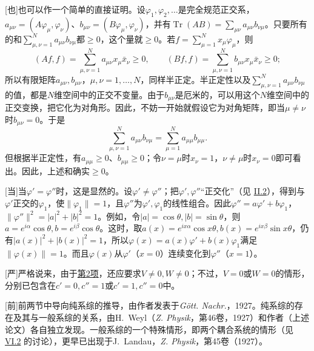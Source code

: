 \documentclass[fontsize=13pt,twoside,openany,headings=normal,parskip=false,bookmarkpackage=false,DIV=calc]{scrbook}
\begin{document}
[也]{也可以作一个简单的直接证明。设$\varphi_1,\allowbreak \varphi_2,\allowbreak \ldots$是完全规范正交系，$a_{\mu\nu}=(A\varphi_\mu,\allowbreak \varphi_\nu)$、$b_{\mu\nu}=(B\varphi_\mu,\allowbreak \varphi_\nu)$，并有$\operatorname{Tr}(AB)=\sum_{\mu\nu}a_{\mu\nu}b_{\nu\mu}$。只要所有的和$\sum_{\mu,\allowbreak \nu=1}^Na_{\mu\nu}b_{\nu\mu}$都$\ge0$，这个量就$\ge0$。若$f=\sum_{\mu=1}^Nx_\mu\varphi_\mu$，则
\[
(Af,f)=\sum_{\mu,\nu=1}^Na_{\mu\nu}x_\mu\bar x_\nu\ge0,\qquad
(Bf,f)=\sum_{\mu,\nu=1}^Nb_{\mu\nu}x_\mu\bar x_\nu\ge0;
\]
所以有限矩阵$a_{\mu\nu},\allowbreak b_{\mu\nu}$，$\mu,\allowbreak \nu=1,\allowbreak \ldots,\allowbreak N$，同样半正定。半正定性以及$\sum_{\mu,\allowbreak \nu=1}^Na_{\mu\nu}b_{\nu\mu}$的值，都是$N$维空间中的正交不变量。由于$b_{\mu\nu}$是厄米的，可以用这个$N$维空间中的正交变换，把它化为对角形。因此，不妨一开始就假设它为对角矩阵，即当$\mu\ne\nu$时$b_{\mu\nu}=0$。于是
\[
\sum_{\mu,\nu=1}^Na_{\mu\nu}b_{\nu\mu}=\sum_{\mu=1}^Na_{\mu\mu}b_{\mu\mu}.
\]
但根据半正定性，有$a_{\mu\mu}\ge0$、$b_{\mu\mu}\ge0$；令$\nu=\mu$时$x_\nu=1$，$\nu\ne\mu$时$x_\nu=0$即可看出。因此，上述和确实$\ge0$。}

[当]{\hypertarget{origpage-258}{}\label{origpage-258}当$\varphi'=\varphi''$时，这是显然的。设$\varphi'\ne\varphi''$；把$\varphi',\allowbreak \varphi''$“正交化”（见 \hyperref[sec:II.2]{II.2}），得到与$\varphi'$正交的$\varphi_1$，使$\|\varphi_1\|=1$，且$\varphi''$为$\varphi',\allowbreak \varphi_1$的线性组合。因此$\varphi''=a\varphi'+b\varphi_1$，$\|\varphi''\|^2=|a|^2+|b|^2=1$。例如，令$|a|=\cos\theta,\allowbreak |b|=\sin\theta$，则$a=e^{i\alpha}\cos\theta,\allowbreak b=e^{i\beta}\cos\theta$。这时，取$a(x)=e^{ix\alpha}\cos x\theta,\allowbreak b(x)=e^{ix\beta}\sin x\theta$，仍有$|a(x)|^2+|b(x)|^2=1$，所以$\varphi(x)=a(x)\varphi'+b(x)\varphi_1$满足$\|\varphi(x)\|=1$。而且$\varphi(x)$从$\varphi'$（$x=0$）连续变化到$\varphi''$（$x=1$）。}

[严]{严格说来，由于\CJKglue \hyperref[remark:IV.2.2]{第2项}，还应要求$V\ne0,\allowbreak W\ne0$；不过，$V=0$或$W=0$的情形，分别已包含在$c'=0,\allowbreak c''=1$或$c'=1,\allowbreak c''=0$中。}

[前]{前两节中导向纯系综的推导，由作者发表于\emph{Gött. Nachr.}，1927。纯系综的存在及其与一般系综的关系，由H.~Weyl（\emph{Z. Physik}，第46卷，1927）和作者（上述论文）各自独立发现。一般系综的一个特殊情形，即两个耦合系统的情形（见 \hyperref[sec:VI.2]{VI.2} 的讨论），更早已出现于J.~Landau，\emph{Z. Physik}，第45卷（1927）。}
\end{document}

